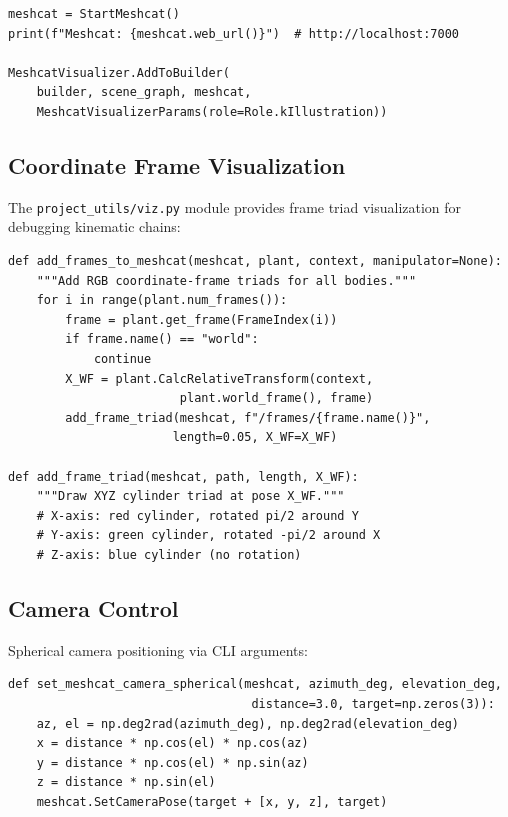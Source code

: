 \documentclass[11pt,a4paper]{article}
\begin{document}
\begin{lstlisting}[caption={Meshcat setup.}]
meshcat = StartMeshcat()
print(f"Meshcat: {meshcat.web_url()}")  # http://localhost:7000

MeshcatVisualizer.AddToBuilder(
    builder, scene_graph, meshcat,
    MeshcatVisualizerParams(role=Role.kIllustration))
\end{lstlisting}

\subsection{Coordinate Frame Visualization}

The \texttt{project\_utils/viz.py} module provides frame triad visualization for debugging kinematic chains:

\begin{lstlisting}[caption={Frame triad helper --- \texttt{project\_utils/viz.py}}]
def add_frames_to_meshcat(meshcat, plant, context, manipulator=None):
    """Add RGB coordinate-frame triads for all bodies."""
    for i in range(plant.num_frames()):
        frame = plant.get_frame(FrameIndex(i))
        if frame.name() == "world":
            continue
        X_WF = plant.CalcRelativeTransform(context,
                        plant.world_frame(), frame)
        add_frame_triad(meshcat, f"/frames/{frame.name()}",
                       length=0.05, X_WF=X_WF)

def add_frame_triad(meshcat, path, length, X_WF):
    """Draw XYZ cylinder triad at pose X_WF."""
    # X-axis: red cylinder, rotated pi/2 around Y
    # Y-axis: green cylinder, rotated -pi/2 around X
    # Z-axis: blue cylinder (no rotation)
\end{lstlisting}

\subsection{Camera Control}

Spherical camera positioning via CLI arguments:

\begin{lstlisting}[caption={Spherical camera setup --- \texttt{project\_utils/viz.py}}]
def set_meshcat_camera_spherical(meshcat, azimuth_deg, elevation_deg,
                                  distance=3.0, target=np.zeros(3)):
    az, el = np.deg2rad(azimuth_deg), np.deg2rad(elevation_deg)
    x = distance * np.cos(el) * np.cos(az)
    y = distance * np.cos(el) * np.sin(az)
    z = distance * np.sin(el)
    meshcat.SetCameraPose(target + [x, y, z], target)
\end{lstlisting}
\end{document}
